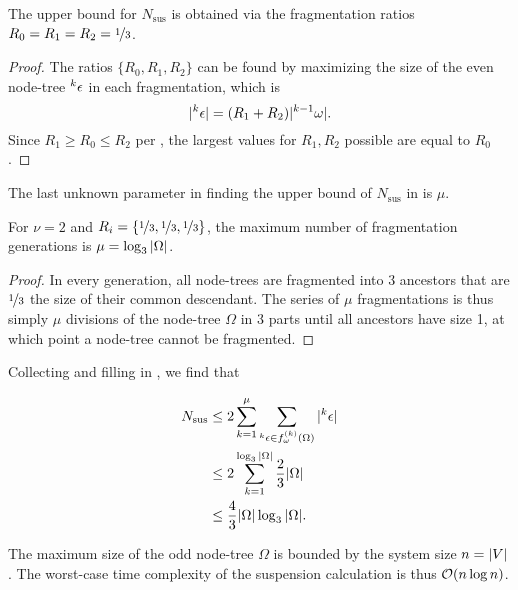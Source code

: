 \begin{theorem}\label{the:ratios}
  The upper bound for $N_{\text{sus}}$ is obtained via the fragmentation ratios $R_0 = R_1 = R_2 = \nicefrac{1}{3}$.
\end{theorem}
\begin{proof}
  The ratios $\{R_0, R_1, R_2\}$ can be found by maximizing the size of the even node-tree ${}^{k}\epsilon$ in each fragmentation, which is 
  \begin{equation*}
    \lvert{}^{k}\epsilon\rvert = (R_1 + R_2)\lvert{}^{k-1}\omega\rvert.
  \end{equation*}
  Since $ R_1 \geq R_0 \leq R_2$ per , the largest values for $R_1, R_2$ possible are equal to $R_0$.
\end{proof}

The last unknown parameter in finding the upper bound of $N_{\text{sus}}$ in  is $\mu$.

\begin{theorem}\label{the:km}
  For $\nu = 2$ and $R_i = \{\nicefrac{1}{3},\nicefrac{1}{3},\nicefrac{1}{3}\}$, the maximum number of fragmentation generations is $\mu = \log_3{\lvert\Omega\rvert}$.
\end{theorem}
\begin{proof}
  In every generation, all node-trees are fragmented into 3 ancestors that are $\nicefrac{1}{3}$ the size of their common descendant. The series of $\mu$ fragmentations is thus simply $\mu$ divisions of the node-tree $\Omega$ in 3 parts until all ancestors have size 1, at which point a node-tree cannot be fragmented.
\end{proof}

Collecting  and filling in , we find that

\begin{align*}
  \nonumber N_{\text{sus}} &\leq 2\sum_{k=1}^\mu{ \sum_{  {}^{k} \epsilon \in f_\omega^{(k)}(\Omega) }{ \lvert {}^{k} \epsilon\rvert}  } \\
  \nonumber         &\leq 2\sum_{k=1}^{\log_3{\lvert\Omega\rvert}} \frac{2}{3}\lvert\Omega\rvert\\
                    &\leq \frac{4}{3}\lvert\Omega\rvert\log_3{\lvert\Omega\rvert}.
\end{align*}

The maximum size of the odd node-tree $\Omega$ is bounded by the system size $n = \lvert V\rvert$. The worst-case time complexity of the suspension calculation is thus $\mathcal{O}(n\log{n})$. 

